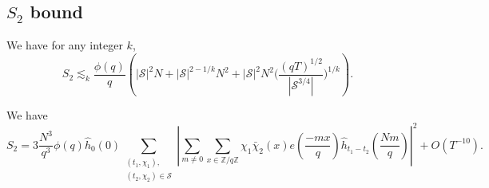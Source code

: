 \subsection{$S_2$ bound}
\begin{proposition}\label{s2bound}
    We have for any integer $k$,
    \[
    S_2\lesssim_k \frac{\phi(q)}{q}\left(|\mathcal{S}|^2N+|\mathcal{S}|^{2-1/k}N^2+|\mathcal{S}|^2N^2\Big(\frac{(qT)^{1/2}}{|\mathcal{S}^{3/4}|}\Big)^{1/k}\right).
    \]
\end{proposition}

\begin{lemma}
    We have 
    \[
    S_2 = 3\frac{N^3}{q^3} \phi(q) \hat{h}_{0}\left(0\right) \sum_{\substack{(t_1,\chi_1),\\(t_2,\chi_2)\in\mathcal{S}}} \left|\sum_{m\neq 0} \sum_{x \in \mathbb{Z}/q\mathbb{Z}}\chi_1\bar{\chi}_2(x) e\left(\frac{-mx}{q}\right)
     \hat{h}_{t_1-t_2}\left(\frac{Nm}{q}\right)\right|^2 + O(T^{-10}).
\]
\end{lemma}
